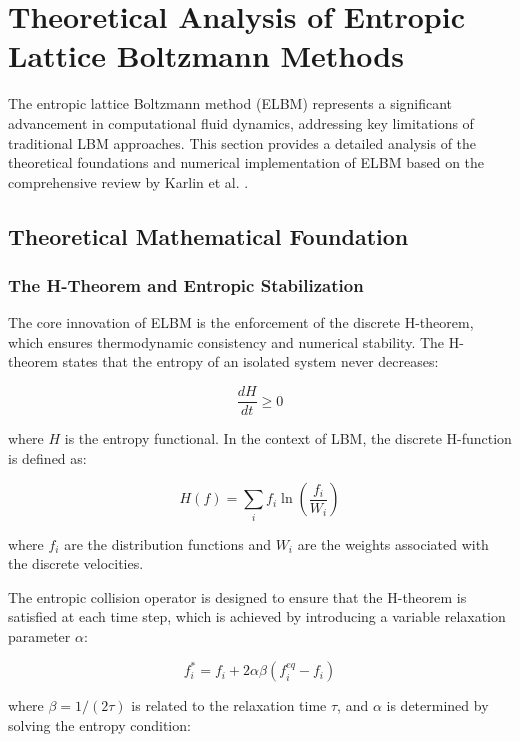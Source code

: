 \documentclass[12pt,a4paper]{article}
\begin{document}
\section{Theoretical Analysis of Entropic Lattice Boltzmann Methods}

The entropic lattice Boltzmann method (ELBM) represents a significant advancement in computational fluid dynamics, addressing key limitations of traditional LBM approaches. This section provides a detailed analysis of the theoretical foundations and numerical implementation of ELBM based on the comprehensive review by Karlin et al. \cite{karlin2015}.

\subsection{Theoretical Mathematical Foundation}

\subsubsection{The H-Theorem and Entropic Stabilization}

The core innovation of ELBM is the enforcement of the discrete H-theorem, which ensures thermodynamic consistency and numerical stability. The H-theorem states that the entropy of an isolated system never decreases:

\begin{equation}
\frac{dH}{dt} \geq 0
\end{equation}

where $H$ is the entropy functional. In the context of LBM, the discrete H-function is defined as:

\begin{equation}
H(f) = \sum_i f_i \ln\left(\frac{f_i}{W_i}\right)
\end{equation}

where $f_i$ are the distribution functions and $W_i$ are the weights associated with the discrete velocities.

The entropic collision operator is designed to ensure that the H-theorem is satisfied at each time step, which is achieved by introducing a variable relaxation parameter $\alpha$:

\begin{equation}
f_i^* = f_i + 2\alpha\beta(f_i^{eq} - f_i)
\end{equation}

where $\beta = 1/(2\tau)$ is related to the relaxation time $\tau$, and $\alpha$ is determined by solving the entropy condition:
\end{document}
